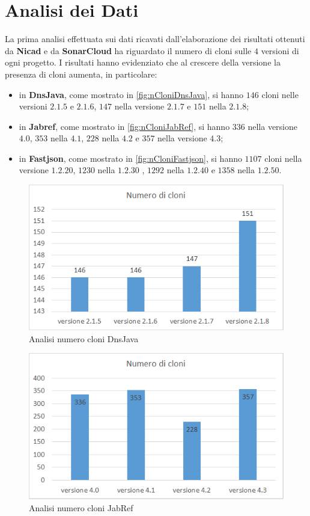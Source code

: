 \section{Analisi dei Dati}
La prima analisi effettuata sui dati ricavati dall'elaborazione dei risultati ottenuti da \textbf{Nicad} e da \textbf{SonarCloud} ha riguardato il numero di cloni sulle $4$ versioni di ogni progetto. I risultati hanno evidenziato che al crescere della versione la presenza di cloni aumenta, in particolare:
\begin{itemize}
	\item in \textbf{DnsJava}, come mostrato in \autoref{fig:nCloniDnsJava}, si hanno $146$ cloni nelle versioni $2.1.5$ e $2.1.6$, $147$ nella versione $2.1.7$ e $151$ nella $2.1.8$;
	\item in \textbf{Jabref}, come mostrato in \autoref{fig:nCloniJabRef}, si hanno $336$ nella versione $4.0$, $353$ nella $4.1$, $228$ nella $4.2$ e $357$ nella versione $4.3$;
	\item in \textbf{Fastjson}, come mostrato in \autoref{fig:nCloniFastjson}, si hanno $1107$ cloni nella versione $1.2.20$, $1230$ nella $1.2.30$ , $1292$ nella $1.2.40$ e $1358$ nella $1.2.50$.
\end{itemize}
\begin{figure}[h]
	\centering
	\includegraphics[scale=0.75, trim = 0cm 0cm 0cm 0cm, clip=true]{Grafici_dnsJava/NumeroCloni.png}
	\caption{Analisi numero cloni DnsJava}
	\label{fig:nCloniDnsJava}
\end{figure}
\begin{figure}[h]
	\centering
	\includegraphics[scale=0.75, trim = 0cm 0cm 0cm 0cm, clip=true]{Grafici_jabRef/NumeroCloni.png}
	\caption{Analisi numero cloni JabRef}
	\label{fig:nCloniJabRef}
\end{figure}
